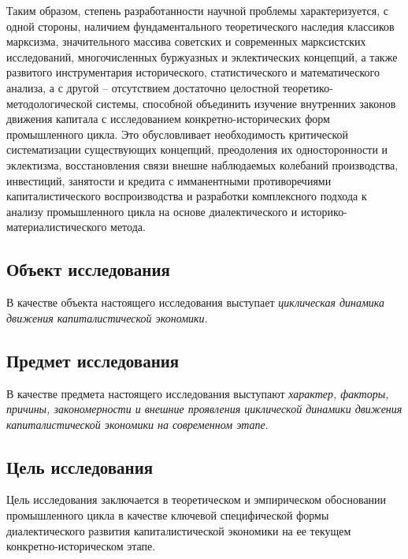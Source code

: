 Таким образом, степень разработанности научной проблемы характеризуется, с одной стороны, наличием фундаментального теоретического наследия классиков марксизма, значительного массива советских и современных марксистских исследований, многочисленных буржуазных и эклектических концепций, а также развитого инструментария исторического, статистического и математического анализа, а с другой – отсутствием достаточно целостной теоретико-методологической системы, способной объединить изучение внутренних законов движения капитала с исследованием конкретно-исторических форм промышленного цикла. Это обусловливает необходимость критической систематизации существующих концепций, преодоления их односторонности и эклектизма, восстановления связи внешне наблюдаемых колебаний производства, инвестиций, занятости и кредита с имманентными противоречиями капиталистического воспроизводства и разработки комплексного подхода к анализу промышленного цикла на основе диалектического и историко-материалистического метода.

\subsection*{Объект исследования}
В качестве объекта настоящего исследования выступает \textit{циклическая динамика движения капиталистической экономики}.

\subsection*{Предмет исследования}
В качестве предмета настоящего исследования выступают \textit{характер, факторы, причины, закономерности и внешние проявления циклической динамики движения капиталистической экономики на современном этапе}.

\subsection*{Цель исследования}
Цель исследования заключается в теоретическом и эмпирическом обосновании промышленного цикла в качестве ключевой специфической формы диалектического развития капиталистической экономики на ее текущем конкретно-историческом этапе.


